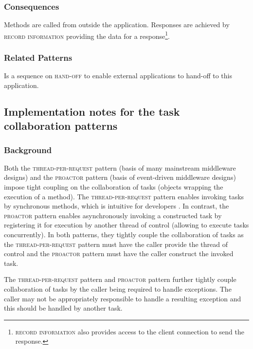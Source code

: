 \documentclass[prodmode]{style/acmlarge}
\begin{document}
\subsubsection*{Consequences} Methods are called from outside the application. 
Responses are achieved by \textsc{record information} providing the data for a
response\footnote{\textsc{record information} also provides access to the client
connection to send the response.}.

\subsubsection*{Related Patterns} Is a sequence on \textsc{hand-off} to enable
external applications to hand-off to this application.



\subsection{Implementation notes for the task collaboration patterns}

\subsubsection*{Background}

Both the \textsc{thread-per-request} pattern \cite{thread-per-request} (basis of
many mainstream middleware designs) and the \textsc{proactor} pattern
\cite{proactor} (basis of event-driven middleware designs) impose tight
coupling on the collaboration of tasks (objects wrapping the execution of a
method).  The \textsc{thread-per-request} pattern enables invoking tasks by
synchronous methods, which is intuitive for developers \cite{proactor}.
In contrast, the \textsc{proactor} pattern enables asynchronously invoking a
constructed task by registering it for execution by another thread of control
(allowing to execute tasks concurrently).  In both patterns, they tightly couple
the collaboration of tasks as the \textsc{thread-per-request} pattern must have
the caller provide the thread of control and the \textsc{proactor} pattern must
have the caller construct the invoked task.

The \textsc{thread-per-request} pattern and \textsc{proactor} pattern further
tightly couple collaboration of tasks by the caller being required to handle
exceptions.  The caller may not be appropriately responsible to handle a
resulting exception and this should be handled by another task.
\end{document}

